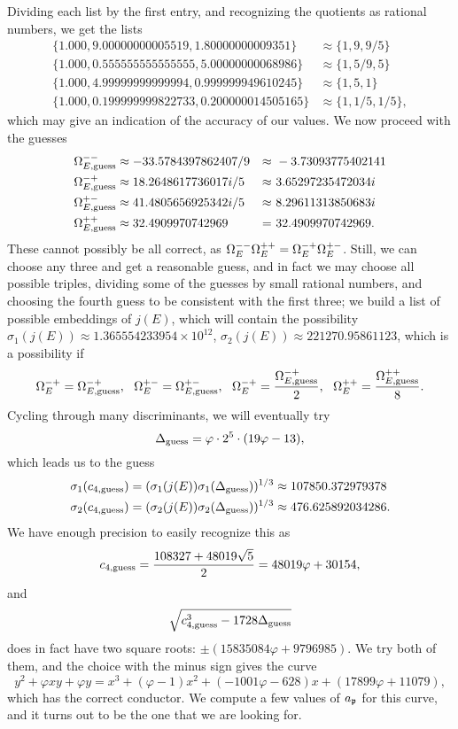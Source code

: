 \documentclass{amsart}
\begin{document}
Dividing each list by the first entry, and recognizing the quotients as rational
numbers, we get the lists
\[
\begin{split}
       \{1.000, 9.00000000005519, 1.80000000009351\}  &\approx \{1, 9, 9/5\}\\
       \{1.000, 0.555555555555555, 5.00000000068986 \} &\approx \{1, 5/9, 5\}\\
       \{1.000, 4.99999999999994, 0.999999949610245 \}  &\approx \{1, 5, 1\} \\ 
       \{1.000, 0.199999999822733, 0.200000014505165 \} &\approx \{1, 1/5, 1/5\},
\end{split}
\]
which may give an indication of the accuracy of our values. We now proceed with
the guesses
\begin{align*}
\phantom{MMMMM} \Omega^{--}_{E, \mathrm{guess}} &\approx -33.5784397862407/9 &\approx&\  -3.73093775402141 \phantom{MMMMM} \\
    \Omega^{-+}_{E, \mathrm{guess}} &\approx 18.2648617736017i/5 &\approx&\  3.65297235472034i \\
    \Omega^{+-}_{E, \mathrm{guess}} &\approx 41.4805656925342i/5 &\approx&\  8.29611313850683i \\
    \Omega^{++}_{E, \mathrm{guess}} &\approx 32.4909970742969    &=&\  32.4909970742969.
\end{align*}
These cannot possibly be all correct, as $\Omega^{--}_E \Omega^{++}_E = \Omega^{-+}_E \Omega^{+-}_E$.
Still, we can choose any three and get a reasonable guess, and in fact we may choose all
possible triples, dividing some of the guesses by small rational numbers, and choosing the
fourth guess to be consistent with the first three; we build a list of possible embeddings
of $j(E)$, which will contain the possibility $\sigma_1(j(E)) \approx 1.365554233954 \times 10^{12}$,
$\sigma_2(j(E)) \approx 221270.95861123$, which is a possibility if 
\[\Omegamp_E = \OmegampEguess,\ \ 
\Omegapm_E = \OmegapmEguess,\ \ \Omegamp_E = \frac{\OmegampEguess}{2},\ \ \Omegapp_E = \frac{\OmegappEguess}{8}.\]
Cycling through many discriminants, we will eventually try
\[
    \Delta_{\textrm{guess}} = \varphi \cdot 2^5 \cdot (19\varphi - 13),
\]
which leads us to the guess
\begin{align*}
    \sigma_1(c_{4,\textrm{guess}}) &= (\sigma_1(j(E)) \sigma_1(\Delta_{\textrm{guess}}))^{1/3} \approx 107850.372979378 \\
    \sigma_2(c_{4,\textrm{guess}}) &= (\sigma_2(j(E)) \sigma_2(\Delta_{\textrm{guess}}))^{1/3} \approx 476.625892034286.
\end{align*}
We have enough precision to easily recognize this as
\[
    c_{4,\textrm{guess}} = \frac{108327 + 48019 \sqrt5}{2} = 48019\varphi + 30154,
\]
and
\[
    \sqrt{c_{4,\textrm{guess}}^3 - 1728\Delta_{\textrm{guess}}}
\]
does in fact have two square roots: $\pm(15835084\varphi + 9796985)$. We try both of them, and
the choice with the minus sign gives the curve
\[
y^2 + \varphi xy + \varphi y = x^3 + \left(\varphi - 1\right)x^2 + \left(-1001 \varphi - 628\right)x + \left(17899 \varphi + 11079\right),
\]
which has the correct conductor. We compute a few values of $a_{\mathfrak{p}}$ for this curve, and it turns
out to be the one that we are looking for.
\end{document}
